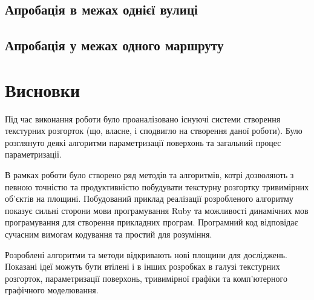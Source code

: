 \documentclass[simple,a4paper,14pt,ukrainian,utf8]{eskdtext}
\begin{document}
	\subsection{Апробація в межах однієї вулиці}
	
	\subsection{Апробація у межах одного маршруту}

  \newpage
  \section*{Висновки}

    Під час виконання роботи було проаналізовано існуючі системи створення текстурних розгорток (що, власне, і сподвигло на створення даної роботи). Було розглянуто деякі алгоритми параметризації поверхонь та загальний процес параметризації.

    В рамках роботи було створено ряд методів та алгоритмів, котрі дозволяють з певною точністю та продуктивністю побудувати текстурну розгортку тривимірних об’єктів на площині. Побудований приклад реалізації розробленого алгоритму показує сильні сторони мови програмування Ruby та можливості  динамічних мов програмування для створення прикладних програм. Програмний код відповідає сучасним вимогам кодування та простий для розуміння.

    Розроблені алгоритми та методи відкривають нові площини для досліджень. Показані ідеї можуть бути втілені і в інших розробках в галузі текстурних розгорток, параметризації поверхонь, тривимірної графіки та комп’ютерного графічного моделювання.
\end{document}
